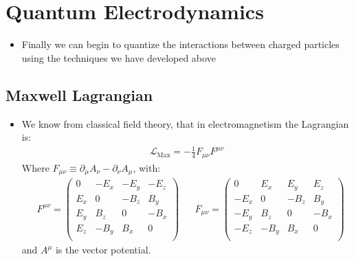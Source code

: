 \documentclass[11pt]{article}
\numberwithin{equation}{section}
\begin{document}
\newpage

\section{Quantum Electrodynamics} %
\label{sec:quantum_electrodynamics}
\begin{itemize}
  \item Finally we can begin to quantize the interactions between charged particles using the techniques we have developed above  
\end{itemize}

\subsection{Maxwell Lagrangian} %
\label{sub:maxwell_lagrangian}
\begin{itemize}
  \item We know from classical field theory, that in electromagnetism the Lagrangian is:
  \begin{align}
  \label{L_max}
       \mathcal{L}_{\text{Max}}  = -\frac{1}{4}F_{\mu\nu}F^{\mu\nu}
     \end{align}   
     Where $F_{\mu\nu} \equiv \partial_{\mu}A_{\nu}-\partial_{\nu}A_{\mu}$, with: 
\begin{align}
\label{F_mn}
       &  F^{\mu\nu} =  \begin{pmatrix}
       0  & -E_x & -E_y & -E_z \\
       E_x&0& -B_z& B_y   \\
       E_y& B_z& 0 & -B_x \\
      E_z& -B_y& B_x& 0 \\
    \end{pmatrix} 
&       
 & F_{\mu\nu} =  \begin{pmatrix}
       0  & E_x& E_y & E_z \\
       -E_x&0& -B_z& B_y   \\
       -E_y& B_z& 0 & -B_x \\
      -E_z& -B_y& B_x& 0 \\
    \end{pmatrix}
\end{align}
     and $A^{\mu}$ is the vector potential.


\end{itemize}
\end{document}
